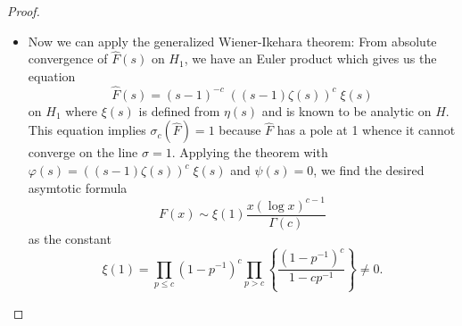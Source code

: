 \documentclass[12pt]{article}
\newcommand{\Fhat}{\widehat{F}}
\begin{document}
\begin{proof}
\begin{itemize}
\item Now we can apply the generalized Wiener-Ikehara theorem: From absolute convergence of $\Fhat(s)$ on $H_1$, we have an Euler product which gives us the equation
$$\Fhat(s) = (s - 1)^{-c} \; ((s - 1) \zeta(s))^c \; \xi(s)$$
on $H_1$ where $\xi(s)$ is defined from $\eta(s)$ and is known to be analytic on $H$. This equation implies $\sigma_c(\Fhat) = 1$ because $\Fhat$ has a pole at 1 whence it cannot converge on the line $\sigma = 1$. Applying the theorem with $\varphi(s) = ((s - 1) \zeta(s))^c \; \xi(s)$ and $\psi(s) = 0$, we find the desired asymtotic formula
$$F(x) \sim \xi(1) \frac{x (\log x)^{c - 1}}{\Gamma(c)}$$
as the constant
$$\xi(1) = \prod_{p \leq c} (1-p^{-1})^c \prod_{p > c} \left\{ \frac{(1 - p^{-1})^c}{1 - c p^{-1}} \right\} \not= 0.$$
\end{itemize}
\end{proof}

\unless\ifdefined\IsMainDocument
\end{document}
